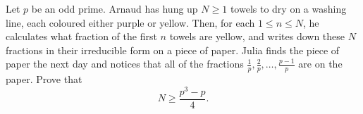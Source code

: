 Let $p$ be an odd prime.
Arnaud has hung up $N\geq 1$ towels to dry on a washing line, each coloured either purple or yellow.
Then, for each $1 \leq n \leq N$, he calculates what fraction of the first $n$ towels are yellow,
and writes down these $N$ fractions in their irreducible form on a piece of paper.
Julia finds the piece of paper the next day and notices that all of the
fractions $\frac{1}{p}, \frac{2}{p}, \dots, \frac{p-1}{p}$ are on the paper.
Prove that 
$$N \geq \frac{p^3-p}{4}.$$
